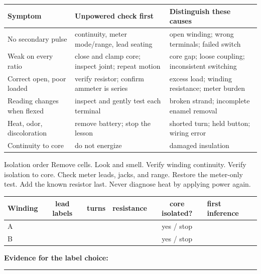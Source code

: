 \begin{center}\small
\begin{tabularx}{\linewidth}{@{}p{.22\linewidth}p{.31\linewidth}L@{}}
\toprule
Symptom & Unpowered check first & Distinguish these causes\\
\midrule
No secondary pulse & continuity, meter mode/range, lead seating &
open winding; wrong terminals; failed switch\\
Weak on every ratio & close and clamp core; inspect joint; repeat motion &
core gap; loose coupling; inconsistent switching\\
Correct open, poor loaded & verify resistor; confirm ammeter is series &
excess load; winding resistance; meter burden\\
Reading changes when flexed & inspect and gently test each terminal &
broken strand; incomplete enamel removal\\
Heat, odor, discoloration & remove battery; stop the lesson &
shorted turn; held button; wiring error\\
Continuity to core & do not energize &
damaged insulation\\
\bottomrule
\end{tabularx}
\end{center}

\begin{gate}{Isolation order}
Remove cells. Look and smell. Verify winding continuity. Verify isolation to
core. Check meter leads, jacks, and range. Restore the meter-only test. Add the
known resistor last. Never diagnose heat by applying power again.
\end{gate}

\newpage
{}

\begin{center}\small
\begin{tabularx}{\linewidth}{@{}lCCCCL@{}}
\toprule
Winding & lead labels & turns & resistance & core isolated? & first inference\\
\midrule
A & & & & yes / stop & \\[1.2em]
B & & & & yes / stop & \\[1.2em]
\bottomrule
\end{tabularx}
\end{center}

\textbf{Evidence for the label choice:}\quad\rule{.70\linewidth}{.3pt}

